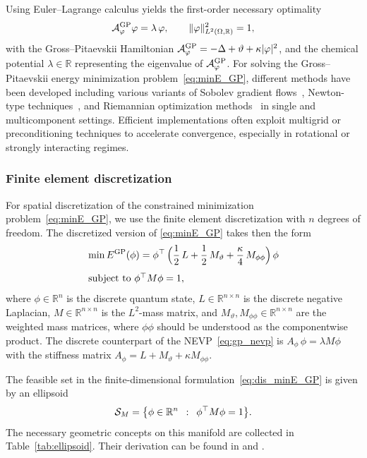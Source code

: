 \documentclass[11pt,reqno]{amsart}
\theoremstyle{plain}
\newcommand\R{\mathbb R}
\newcommand\calA{\mathcal A}
\newcommand\calS{\mathcal S}
\newcommand{\GP}{{\rm GP}}
\begin{document}
	Using Euler--Lagrange calculus yields the first-order necessary optimality 
	\begin{equation}\label{eq:gp_nevp}
		\calA_\varphi^{\GP} \varphi 
		= \lambda\,\varphi, \qquad \|\varphi\|_{L^2(\Omega,\R)}^2=1,
	\end{equation}
	with the Gross--Pitaevskii Hamiltonian $\calA_\varphi^{\GP} = -\Delta + \vartheta + \kappa|\varphi|^2$, and the chemical potential \mbox{$\lambda \in \R$} representing the eigenvalue of $\calA^{\GP}_\varphi$. 
	For solving the Gross--Pitaevskii energy minimization problem~\eqref{eq:minE_GP}, different methods have been developed including
	various variants of Sobolev gradient flows~\cite{BaoD04,ChenLLZ24,HenP20},
	Newton-type techniques~\cite{DuL22,WuWB17}, 
	and Riemannian optimization methods~\cite{AltPS22,DanP17,HenY25,HerSY25} in single and multicomponent settings. Efficient implementations often exploit multigrid \cite{BorH08,XuXXF21} or preconditioning techniques \cite{AntLT17,FenT25} to accelerate convergence, especially in rotational or strongly interacting regimes.
	
	\subsubsection{Finite element discretization}
	For spatial discretization of the constrained minimization problem~\eqref{eq:minE_GP},
	we use the finite element discretization with $n$ degrees of freedom. The discretized version of \eqref{eq:minE_GP} takes then the form
	\begin{equation}\label{eq:dis_minE_GP}
		\begin{array}{l}
			\displaystyle{\min E^{\rm GP}(\phi)
				=  \phi^\top \, \Big(\frac{1}{2}\, L 
				+ \frac{1}{2}\, M_{\vartheta} 
				+ \frac{\kappa}{4}\, M_{\phi\phi}\Big)\, \phi} \\[4mm]
			\text{subject to } \phi^\top M\phi=1,		
		\end{array}
	\end{equation}
	where $\phi\in\R^n$ is the discrete quantum state, $L\in\R^{n\times n}$ is the discrete negative Laplacian, $M\in\R^{n\times n}$ is the $L^2$-mass matrix, and \mbox{$M_\vartheta, M_{\phi\phi}\in\R^{n\times n}$} are the weighted mass matrices, where $\phi\phi$ should be understood as the componentwise product. The discrete counterpart of the NEVP~\eqref{eq:gp_nevp}
	is $A_\phi\, \phi=\lambda M\phi$ with the stiffness matrix $A_\phi = L+M_\vartheta + \kappa M_{\phi\phi}$.
	
	The feasible set in the finite-dimensional formulation~\eqref{eq:dis_minE_GP} is given by an ellipsoid 
	\[
	\calS_{M}=\big\{ \phi\in\mathbb{R}^{n}\enskip:\enskip \phi^{\top}M\phi=1\big\}. 
	\]
	The necessary geometric concepts on this manifold are collected in Table~\ref{tab:ellipsoid}. Their derivation can be found in \cite[Example~8.1.4]{AbsMS08} and \cite{Hua13}.
	
\end{document}
